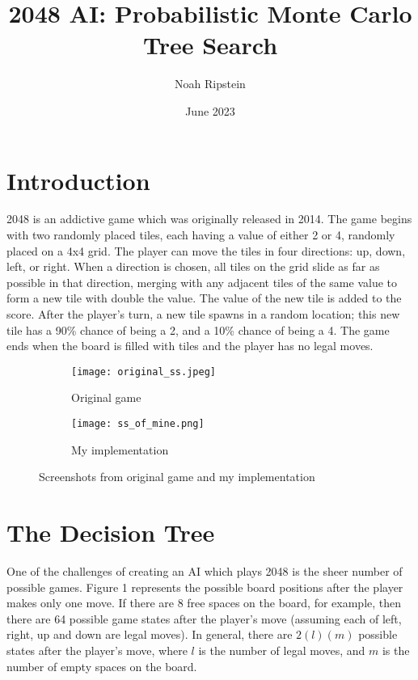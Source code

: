 \documentclass{article}
\title{2048 AI: Probabilistic Monte Carlo Tree Search}
\author{Noah Ripstein}
\date{June 2023}
\begin{document}
\maketitle

\section{Introduction}

2048 is an addictive game which was originally released in 2014.  The game begins with two randomly placed tiles, each having a value of either 2 or 4, randomly placed on a 4x4 grid. The player can move the tiles in four directions: up, down, left, or right. When a direction is chosen, all tiles on the grid slide as far as possible in that direction, merging with any adjacent tiles of the same value to form a new tile with double the value.  The value of the new tile is added to the score. After the player's turn,  a new tile spawns in a random location; this new tile has a 90\% chance of being a 2, and a 10\% chance of being a 4.   The game ends when the board is filled with tiles and the player has no legal moves.



\begin{figure}[htbp]
  \centering
  \begin{subfigure}[b]{0.45\textwidth}
    \texttt{[image: original\_ss.jpeg]}
    \caption{Original game}
    \label{fig:original_ss}
  \end{subfigure}
  \hfill
  \begin{subfigure}[b]{0.45\textwidth}
    \texttt{[image: ss\_of\_mine.png]}
    \caption{My implementation}
    \label{fig:ss_of_mine}
  \end{subfigure}
  \caption{Screenshots from original game and my implementation}
  \label{fig:screenshots}
\end{figure}

\section{The Decision Tree}

One of the challenges of creating an AI which plays 2048 is the sheer number of possible games.  Figure 1 represents the possible board positions after the player makes only one move.  If there are 8 free spaces on the board, for example, then there are 64 possible game states after the player's move (assuming each of left, right, up and down are legal moves).  In general, there are $2(l)(m)$ possible states after the player's move, where $l$ is the number of legal moves, and $m$ is the number of empty spaces on the board.\\
\end{document}
